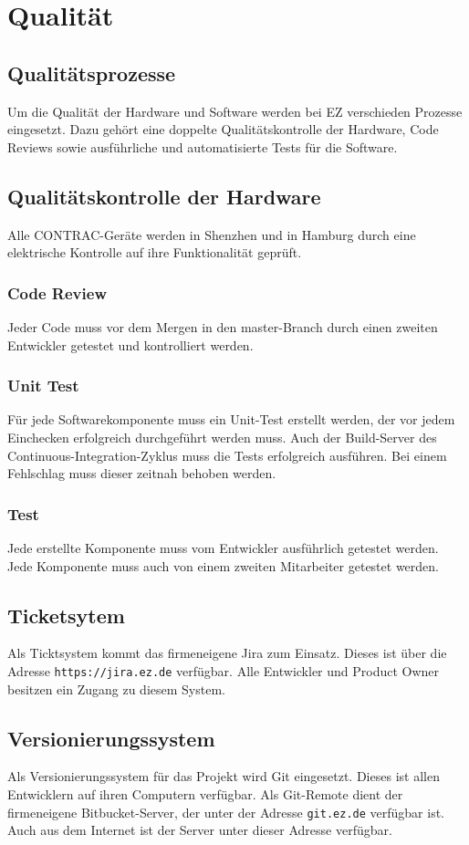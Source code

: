 \section{Qualität}
\subsection{Qualitätsprozesse}
Um die Qualität der Hardware und Software werden bei EZ verschieden Prozesse eingesetzt. Dazu gehört eine doppelte Qualitätskontrolle der Hardware, Code Reviews sowie ausführliche und automatisierte Tests für die Software.
\subsection{Qualitätskontrolle der Hardware}
Alle CONTRAC-Geräte werden in Shenzhen und in Hamburg durch eine elektrische Kontrolle auf ihre Funktionalität geprüft.
\subsubsection{Code Review}
Jeder Code muss vor dem Mergen in den master-Branch durch einen zweiten Entwickler getestet und kontrolliert werden.
\subsubsection{Unit Test}
Für jede Softwarekomponente muss ein Unit-Test erstellt werden, der vor jedem Einchecken erfolgreich durchgeführt werden muss. Auch der Build-Server des Continuous-Integration-Zyklus muss die Tests erfolgreich ausführen. Bei einem Fehlschlag muss dieser zeitnah behoben werden.
\subsubsection{Test}
Jede erstellte Komponente muss vom Entwickler ausführlich getestet werden. Jede Komponente muss auch von einem zweiten Mitarbeiter getestet werden.
\subsection{Ticketsytem}
Als Ticktsystem kommt das firmeneigene Jira zum Einsatz. Dieses ist über die Adresse \texttt{https://jira.ez.de} verfügbar. Alle Entwickler und Product Owner besitzen ein Zugang zu diesem System.
\subsection{Versionierungssystem}
Als Versionierungssystem für das Projekt wird Git eingesetzt. Dieses ist allen Entwicklern auf ihren Computern verfügbar. Als Git-Remote dient der firmeneigene Bitbucket-Server, der unter der Adresse \texttt{git.ez.de} verfügbar ist. Auch aus dem Internet ist der Server unter dieser Adresse verfügbar.

